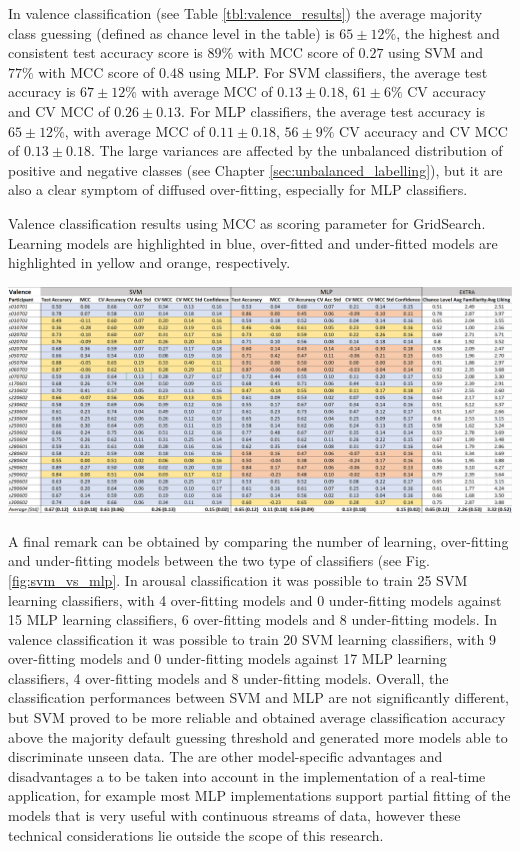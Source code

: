In valence classification (see Table \ref{tbl:valence_results}) the average majority class guessing (defined as chance level in the table) is \(65\pm12\%\), the highest and consistent test accuracy score is \(89\%\) with \ac{MCC} score of \(0.27\) using \ac{SVM} and \(77\%\) with \ac{MCC} score of \(0.48\) using \ac{MLP}. For \ac{SVM} classifiers, the average test accuracy is \( 67\pm12\%\) with average MCC of \(0.13\pm0.18\), \(61\pm6\% \) \ac{CV} accuracy and \ac{CV MCC} of \(0.26\pm0.13\). For \ac{MLP} classifiers, the average test accuracy is \(65\pm12\%\), with average MCC of \(0.11\pm0.18\), \(56\pm9\% \) \ac{CV} accuracy and \ac{CV MCC} of \(0.13\pm0.18\). The large variances are affected by the unbalanced distribution of positive and negative classes (see Chapter \ref{sec:unbalanced_labelling}), but it are also a clear symptom of diffused over-fitting, especially for \ac{MLP} classifiers. 

\begin{table}[h!]
  \caption{Valence classification results using MCC as scoring parameter for GridSearch. Learning models are highlighted in blue, over-fitted and under-fitted models are highlighted in yellow and orange, respectively.}
  \label{tbl:valence_results}
  \includegraphics[width=\linewidth]{img/results/valence_results.png}
\end{table}

A final remark can be obtained by comparing the number of learning, over-fitting and under-fitting models between the two type of classifiers (see Fig. \ref{fig:svm_vs_mlp}. In arousal classification it was possible to train 25 \ac{SVM} learning classifiers, with 4 over-fitting models and 0 under-fitting models against 15 \ac{MLP} learning classifiers, 6 over-fitting models and 8 under-fitting models. In valence classification it was possible to train 20 \ac{SVM} learning classifiers, with 9 over-fitting models and 0 under-fitting models against 17 \ac{MLP} learning classifiers, 4 over-fitting models and 8 under-fitting models. 
Overall, the classification performances between \ac{SVM} and \ac{MLP} are not significantly different, but \ac{SVM} proved to be more reliable and obtained average classification accuracy above the majority default guessing threshold and generated more models able to discriminate unseen data. The are other model-specific advantages and disadvantages a to be taken into account in the implementation of a real-time application, for example most \ac{MLP} implementations support partial fitting of the models that is very useful with continuous streams of data, however these technical considerations lie outside the scope of this research.

